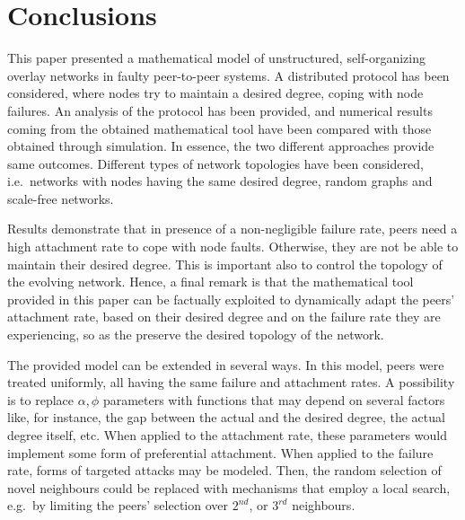 \documentclass[a4paper,twosided]{article}
\begin{document}
\section{Conclusions}
\label{sec:conc}

This paper presented a mathematical model of unstructured, self-orga\-ni\-zing overlay networks in faulty peer-to-peer systems. A distributed protocol has been considered, where nodes try to maintain a desired degree, coping with node failures. 
An analysis of the protocol has been provided, and numerical results coming from the obtained mathematical tool have been compared with those obtained through simulation. In essence, the two different approaches provide same outcomes. Different types of network topologies have been considered, i.e.~networks with nodes having the same desired degree, random graphs and scale-free networks.

Results demonstrate that in presence of a non-negligible failure rate, peers need a high attachment rate to cope with node faults. Otherwise, they are not be able to maintain their desired degree. This is important also to control the topology of the evolving network.
Hence, a final remark is that the mathematical tool provided in this paper can be factually exploited to dynamically adapt the peers' attachment rate, based on their desired degree and on the failure rate they are experiencing, so as the preserve the desired topology of the network.

The provided model can be extended in several ways. 
In this model, peers were treated uniformly, all having the same failure and attachment rates. 
A possibility is to replace $\alpha, \phi$ parameters with functions that may depend on several factors like, for instance, the gap between the actual and the desired degree, the actual degree itself, etc. When applied to the attachment rate, these parameters would implement some form of preferential attachment. When applied to the failure rate, forms of targeted attacks may be modeled.
Then, the random selection of novel neighbours could be replaced with mechanisms that employ a local search, e.g.~by limiting the peers' selection over $2^{nd}$, or $3^{rd}$ neighbours. 















\end{document}

